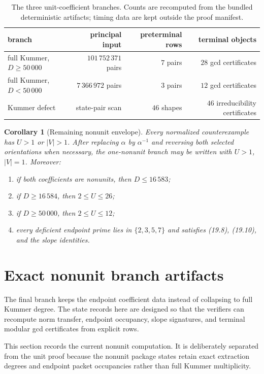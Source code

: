 \documentclass[11pt]{article}
\newtheorem{corollary}[theorem]{Corollary}
\theoremstyle{definition}
\begin{document}
\begin{table}[ht]
\centering
\begin{tabular}{lrrr}
\hline
branch & principal input & preterminal rows & terminal objects\\
\hline
full Kummer, \(D\geq50\,000\) & \(101\,752\,371\) pairs & \(7\) pairs & \(28\) gcd certificates\\
full Kummer, \(D<50\,000\) & \(7\,366\,972\) pairs & \(3\) pairs & \(12\) gcd certificates\\
Kummer defect & state-pair scan & \(46\) shapes & \(46\) irreducibility certificates\\
\hline
\end{tabular}
\caption{The three unit-coefficient branches.  Counts are recomputed from the
bundled deterministic artifacts; timing data are kept outside the proof
manifest.}
\end{table}

\begin{corollary}[Remaining nonunit envelope]\label{cor:remainingnonunit}
Every normalized counterexample has \(U>1\) or \(|V|>1\).  After replacing
\(\alpha\) by \(\alpha^{-1}\) and reversing both selected orientations when
necessary, the one-nonunit branch may be written with \(U>1\), \(|V|=1\).
Moreover:
\begin{enumerate}[label=(\roman*)]
\item if both coefficients are nonunits, then \(D\leq16\,583\);
\item if \(D\geq16\,584\), then \(2\leq U\leq26\);
\item if \(D\geq50\,000\), then \(2\leq U\leq12\);
\item every deficient endpoint prime lies in \(\{2,3,5,7\}\) and satisfies
(19.8), (19.10), and the slope identities.
\end{enumerate}
\end{corollary}


\section{Exact nonunit branch artifacts}
\label{sec:nonunitcomputation}

The final branch keeps the endpoint coefficient data instead of collapsing to full Kummer degree.  The state records here are designed so that the verifiers can recompute norm transfer, endpoint occupancy, slope signatures, and terminal modular gcd certificates from explicit rows.

This section records the current nonunit computation.  It is deliberately
separated from the unit proof because the nonunit package states retain exact
extraction degrees and endpoint packet occupancies rather than full Kummer
multiplicity.
\end{document}
